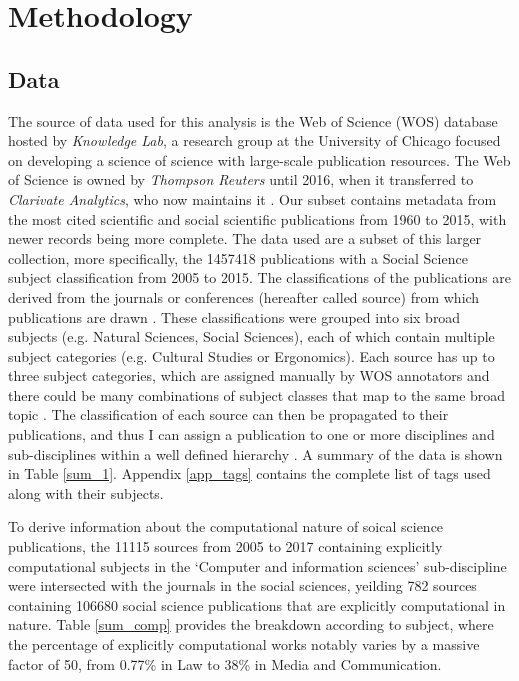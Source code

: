 \documentclass[12pt, a4paper]{article}
\begin{document}
\section{Methodology}

\subsection{Data}

The source of data used for this analysis is the Web of Science (WOS) database hosted by  \textit{Knowledge Lab}, a research group at the University of Chicago focused on developing  a  science  of  science \citep{chu2018too} with  large-scale publication resources. The Web of Science is owned by \textit{Thompson Reuters} until 2016, when it transferred to \textit{Clarivate Analytics}, who now maintains it \citep{clarivate}. Our  subset contains metadata from the most cited scientific and  social scientific publications from 1960 to 2015, with newer records being more complete. The data used are a subset of this larger collection, more specifically, the \num{1457418} publications with a Social Science subject classification from 2005 to 2015. The classifications of the publications are derived from the journals or conferences (hereafter called source) from which publications are drawn \citep{kottawos}. These  classifications  were grouped into six broad subjects (e.g. Natural Sciences, Social Sciences), each of which contain multiple subject categories (e.g. Cultural Studies or Ergonomics). Each source has up to three subject categories, which are assigned manually by WOS annotators and there could be many combinations  of 	subject classes that map to the same broad topic \citep{efremenkova2016comparison}. The classification  of  each  source  can  then  be  propagated to their publications, and thus I can assign a publication to one or more disciplines and sub-disciplines within a well defined hierarchy \citep{wossubjects}. A summary of the data is shown in Table \ref{sum_1}. Appendix \ref{app_tags} contains the complete list of tags used along with their subjects.

To derive information about the computational nature of soical science
publications, the \num{11115} sources from 2005 to 2017 containing explicitly computational subjects in the `Computer and information sciences' sub-discipline were intersected with the journals in the social sciences, yeilding \num{782} sources containing \num{106680} social science publications that are explicitly computational in nature. Table \ref{sum_comp} provides the breakdown according to subject, where the percentage of explicitly computational works notably varies by a massive factor of \num{50}, from \num{0.77}\% in Law to \num{38}\% in Media and Communication. 
\end{document}
